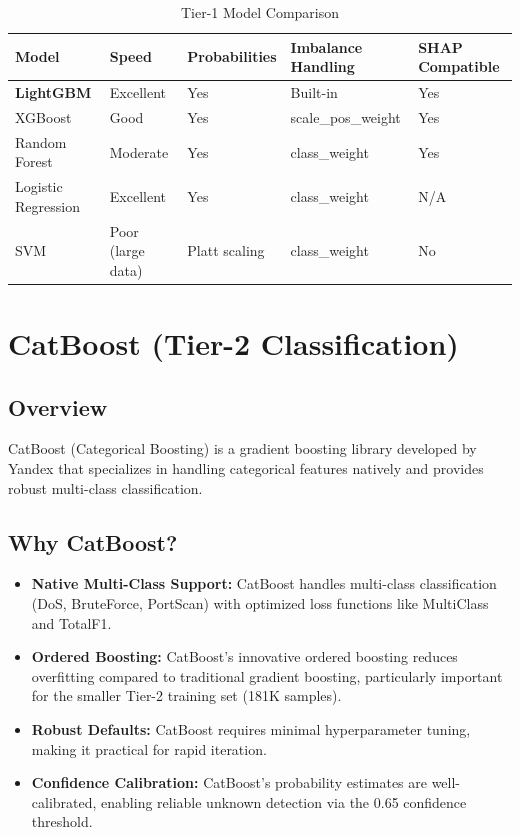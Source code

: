 \documentclass[12pt,a4paper,twoside]{report}
\begin{document}
\begin{table}[H]
\centering
\caption{Tier-1 Model Comparison}
\begin{tabularx}{\textwidth}{lXXXX}
\toprule
\textbf{Model} & \textbf{Speed} & \textbf{Probabilities} & \textbf{Imbalance Handling} & \textbf{SHAP Compatible} \\
\midrule
\textbf{LightGBM} & Excellent & Yes & Built-in & Yes \\
XGBoost & Good & Yes & scale\_pos\_weight & Yes \\
Random Forest & Moderate & Yes & class\_weight & Yes \\
Logistic Regression & Excellent & Yes & class\_weight & N/A \\
SVM & Poor (large data) & Platt scaling & class\_weight & No \\
\bottomrule
\end{tabularx}
\end{table}

\section{CatBoost (Tier-2 Classification)}

\subsection{Overview}

CatBoost (Categorical Boosting) is a gradient boosting library developed by Yandex that specializes in handling categorical features natively and provides robust multi-class classification.

\subsection{Why CatBoost?}

\begin{itemize}
    \item \textbf{Native Multi-Class Support:} CatBoost handles multi-class classification (DoS, BruteForce, PortScan) with optimized loss functions like MultiClass and TotalF1.
    \item \textbf{Ordered Boosting:} CatBoost's innovative ordered boosting reduces overfitting compared to traditional gradient boosting, particularly important for the smaller Tier-2 training set (181K samples).
    \item \textbf{Robust Defaults:} CatBoost requires minimal hyperparameter tuning, making it practical for rapid iteration.
    \item \textbf{Confidence Calibration:} CatBoost's probability estimates are well-calibrated, enabling reliable unknown detection via the 0.65 confidence threshold.
\end{itemize}
\end{document}
